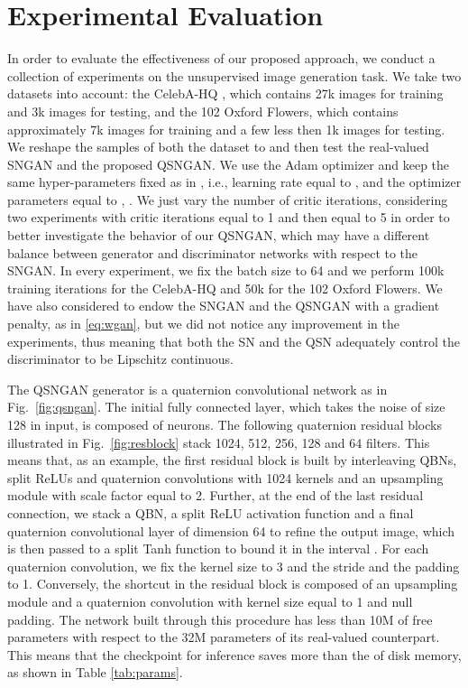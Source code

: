 \documentclass[graybox]{svmult}
\begin{document}
\section{Experimental Evaluation}
\label{sec:exp}
\noindent In order to evaluate the effectiveness of our proposed approach, we conduct a collection of experiments on the unsupervised image generation task. We take two datasets into account: the CelebA-HQ \cite{KarrasPG2018}, which contains 27k images for training and 3k images for testing, and the 102 Oxford Flowers, which contains approximately 7k images for training and a few less then 1k images for testing. We reshape the samples of both the dataset to  and then test the real-valued SNGAN and the proposed QSNGAN. We use the Adam optimizer and keep the same hyper-parameters fixed as in \cite{Miyato2018SpectralNF}, i.e., learning rate equal to , and the optimizer parameters equal to , . We just vary the number of critic iterations, considering two experiments with critic iterations equal to 1 and then equal to 5 in order to better investigate the behavior of our QSNGAN, which may have a different balance between generator and discriminator networks with respect to the SNGAN. In every experiment, we fix the batch size to 64 and we perform 100k training iterations for the CelebA-HQ and 50k for the 102 Oxford Flowers. We have also considered to endow the SNGAN and the QSNGAN with a gradient penalty, as in \eqref{eq:wgan}, but we did not notice any improvement in the experiments, thus meaning that both the SN and the QSN adequately control the discriminator to be Lipschitz continuous.

The QSNGAN generator is a quaternion convolutional network as in Fig.~\ref{fig:qsngan}. The initial fully connected layer, which takes the noise of size 128 in input, is composed of  neurons. The following quaternion residual blocks illustrated in Fig.~\ref{fig:resblock} stack 1024, 512, 256, 128 and 64 filters. This means that, as an example, the first residual block is built by interleaving QBNs, split ReLUs and quaternion convolutions with 1024 kernels and an upsampling module with scale factor equal to 2. Further, at the end of the last residual connection, we stack a QBN, a split ReLU activation function and a final quaternion convolutional layer of dimension 64 to refine the output image, which is then passed to a split Tanh function to bound it in the interval . For each quaternion convolution, we fix the kernel size to 3 and the stride and the padding to 1. Conversely, the shortcut in the residual block is composed of an upsampling module and a quaternion convolution with kernel size equal to 1 and null padding. The network built through this procedure has less than 10M of free parameters with respect to the 32M parameters of its real-valued counterpart. This means that the checkpoint for inference saves more than the  of disk memory, as shown in Table \ref{tab:params}.
\end{document}
